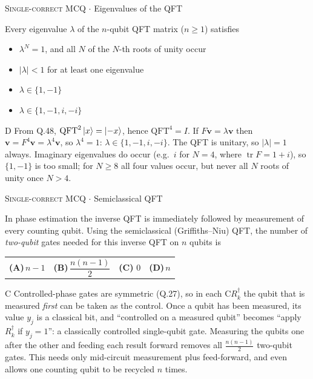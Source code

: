 \documentclass[11pt,a4paper]{article}
\newcommand{\optlabel}[1]{\textbf{(#1)}}
\newcommand{\correctlabel}[1]{\textcolor{okgreen}{\textbf{(#1)}\,\ding{51}}}
\newenvironment{qitem}[1]{\begin{list}{}{\setlength{\leftmargin}{3.3em}\setlength{\labelwidth}{3.1em}%
  \setlength{\labelsep}{0.2em}\setlength{\topsep}{3pt}\setlength{\parsep}{3pt}}\item[\textbf{Q.#1}\hfill]}{\end{list}}
\newcommand{\qsep}{\par\vspace{2pt}{\color{black!15}\hrule}\vspace{4pt}}
\newcommand{\qmeta}[2]{{\footnotesize\color{black!60}\textsc{#1} \;$\cdot$\; #2}\par}
\begin{document}
\begin{qitem}{73}
\qmeta{Single-correct MCQ}{Eigenvalues of the QFT}
Every eigenvalue $\lambda$ of the $n$-qubit QFT matrix ($n \ge 1$) satisfies
\begin{itemize}[leftmargin=2.6em, labelsep=0.4em, itemsep=2pt, topsep=3pt]
\item[\optlabel{A}] $\lambda^{N} = 1$, and all $N$ of the $N$-th roots of unity occur
\item[\optlabel{B}] $|\lambda| < 1$ for at least one eigenvalue
\item[\optlabel{C}] $\lambda \in \{1, -1\}$
\item[\correctlabel{D}] $\lambda \in \{1, -1, i, -i\}$
\end{itemize}
\end{qitem}
\begin{solbox}{D}
From Q.48, $\mathrm{QFT}^2\ket x = \ket{-x}$, hence $\mathrm{QFT}^4 = I$. If $F\mathbf v = \lambda\mathbf v$ then
$\mathbf v = F^4\mathbf v = \lambda^4\mathbf v$, so $\lambda^4 = 1$: $\lambda \in \{1, -1, i, -i\}$. The QFT is unitary, so $|\lambda| = 1$
always. Imaginary eigenvalues do occur (e.g.\ $i$ for $N = 4$, where $\operatorname{tr}F = 1 + i$), so $\{1, -1\}$ is too small;
for $N \ge 8$ all four values occur, but never all $N$ roots of unity once $N > 4$.
\end{solbox}
\qsep

\begin{qitem}{74}
\qmeta{Single-correct MCQ}{Semiclassical QFT}
In phase estimation the inverse QFT is immediately followed by measurement of every counting qubit. Using the
semiclassical (Griffiths--Niu) QFT, the number of \emph{two-qubit} gates needed for this inverse QFT on $n$ qubits is
\par\smallskip\noindent\begin{tabularx}{\linewidth}{@{}*{4}{L}@{}}
\optlabel{A}\,$n - 1$ & \optlabel{B}\,$\dfrac{n(n-1)}{2}$ & \correctlabel{C}\,$0$ & \optlabel{D}\,$n$
\end{tabularx}
\end{qitem}
\begin{solbox}{C}
Controlled-phase gates are symmetric (Q.27), so in each $\mathrm{C}R_k^\dagger$ the qubit that is measured \emph{first} can be
taken as the control. Once a qubit has been measured, its value $y_j$ is a classical bit, and ``controlled on a measured
qubit'' becomes ``apply $R_k^\dagger$ if $y_j = 1$'': a classically controlled single-qubit gate. Measuring the qubits one
after the other and feeding each result forward removes all $\frac{n(n-1)}{2}$ two-qubit gates. This needs only
mid-circuit measurement plus feed-forward, and even allows one counting qubit to be recycled $n$ times.
\end{solbox}
\qsep
\end{document}
